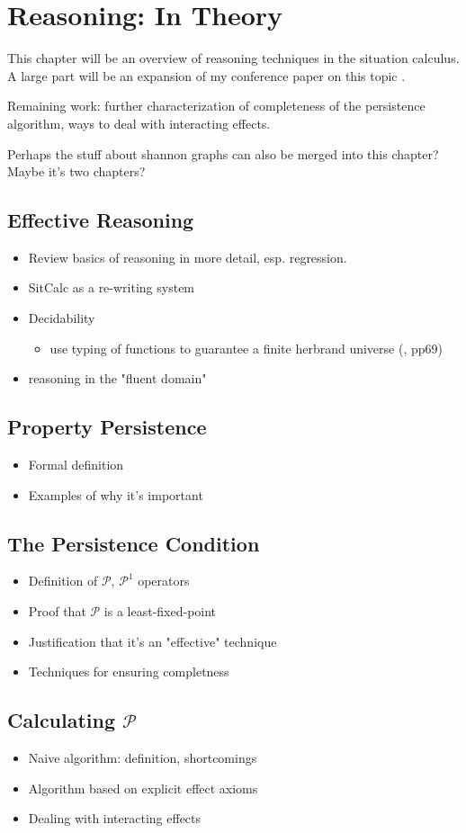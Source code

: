 \chapter{Reasoning: In Theory}\label{ch:reasoning-theory}

This chapter will be an overview of reasoning techniques in the situation
calculus.  A large part will be an expansion of my conference paper on this topic \cite{kelly07sc_persistence}.

Remaining work: further characterization of completeness of the persistence algorithm, ways to deal with interacting effects.

Perhaps the stuff about shannon graphs can also be merged into this chapter?
Maybe it's two chapters?

\section{Effective Reasoning}

\begin{itemize}
\item Review basics of reasoning in more detail, esp. regression.
\item SitCalc as a re-writing system
\item Decidability
  \begin{itemize}
  \item use typing of functions to guarantee a finite herbrand universe (\cite{levesque04krr_book}, pp69)
  \end{itemize}
\item reasoning in the "fluent domain"
\end{itemize}

\section{Property Persistence}

\begin{itemize}
\item Formal definition
\item Examples of why it's important
\end{itemize}

\section{The Persistence Condition}

\begin{itemize}
\item Definition of $\mathcal{P}$, $\mathcal{P}^{1}$ operators
\item Proof that $\mathcal{P}$ is a least-fixed-point
\item Justification that it's an "effective" technique
\item Techniques for ensuring completness
\end{itemize}

\section{Calculating $\mathcal{P}$}

\begin{itemize}
\item Naive algorithm: definition, shortcomings
\item Algorithm based on explicit effect axioms
\item Dealing with interacting effects
\end{itemize}



